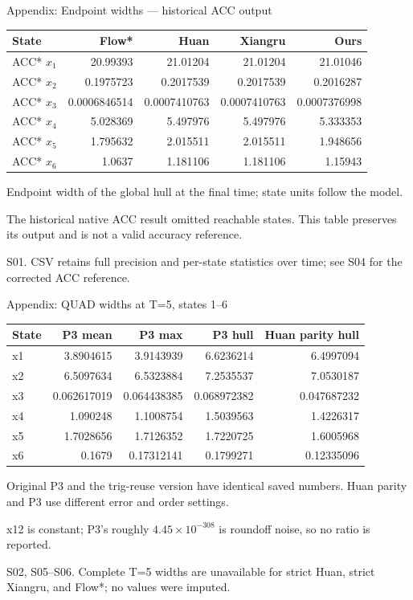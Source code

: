 \documentclass[aspectratio=169,11pt]{beamer}
\newcommand{\src}[1]{\par\vfill{\fontsize{7}{9}\selectfont\color{gray}#1\par}}
\begin{document}
\begin{frame}[t]{Appendix: Endpoint widths — historical ACC output}
\relax
\relax
{\footnotesize\setlength{\tabcolsep}{3.2pt}\renewcommand{\arraystretch}{1.18}
\noindent\begin{tabular*}{\linewidth}{@{\extracolsep{\fill}}lrrrr@{}}\toprule
\textbf{State} & \textbf{Flow*} & \textbf{Huan} & \textbf{Xiangru} & \textbf{Ours}\\ \midrule
ACC* \(x_1\) & 20.99393 & 21.01204 & 21.01204 & 21.01046\\
ACC* \(x_2\) & 0.1975723 & 0.2017539 & 0.2017539 & 0.2016287\\
ACC* \(x_3\) & 0.0006846514 & 0.0007410763 & 0.0007410763 & 0.0007376998\\
ACC* \(x_4\) & 5.028369 & 5.497976 & 5.497976 & 5.333353\\
ACC* \(x_5\) & 1.795632 & 2.015511 & 2.015511 & 1.948656\\
ACC* \(x_6\) & 1.0637 & 1.181106 & 1.181106 & 1.15943\\
\bottomrule\end{tabular*}\par{}}\vspace{0.25cm}Endpoint width of the global hull at the final time; state units follow the model.\par{} The historical native ACC result omitted reachable states. This table preserves its output and is not a valid accuracy reference.
\src{S01. CSV retains full precision and per-state statistics over time; see S04 for the corrected ACC reference.}
\end{frame}

\begin{frame}[t]{Appendix: QUAD widths at T=5, states 1–6}
\relax
\relax
{\footnotesize\setlength{\tabcolsep}{3.2pt}\renewcommand{\arraystretch}{1.18}
\noindent\begin{tabular*}{\linewidth}{@{\extracolsep{\fill}}lrrrr@{}}\toprule
\textbf{State} & \textbf{P3 mean} & \textbf{P3 max} & \textbf{P3 hull} & \textbf{Huan parity hull}\\ \midrule
x1 & 3.8904615 & 3.9143939 & 6.6236214 & 6.4997094\\
x2 & 6.5097634 & 6.5323884 & 7.2535537 & 7.0530187\\
x3 & 0.062617019 & 0.064438385 & 0.068972382 & 0.047687232\\
x4 & 1.090248 & 1.1008754 & 1.5039563 & 1.4226317\\
x5 & 1.7028656 & 1.7126352 & 1.7220725 & 1.6005968\\
x6 & 0.1679 & 0.17312141 & 0.1799271 & 0.12335096\\
\bottomrule\end{tabular*}\par{}}\vspace{0.3cm}Original P3 and the trig-reuse version have identical saved numbers. Huan parity and P3 use different error and order settings.\par{}x12 is constant; P3's roughly \(4.45\times10^{-308}\) is roundoff noise, so no ratio is reported.
\src{S02, S05–S06. Complete T=5 widths are unavailable for strict Huan, strict Xiangru, and Flow*; no values were imputed.}
\end{frame}
\end{document}
